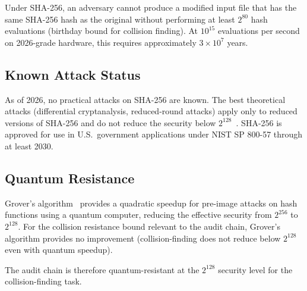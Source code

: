 \begin{theorem}
Under SHA-256, an adversary cannot produce a modified input file that
has the same SHA-256 hash as the original without performing at least
$2^{80}$ hash evaluations (birthday bound for collision finding).
At $10^{15}$ evaluations per second on 2026-grade hardware, this requires
approximately $3 \times 10^7$ years.
\end{theorem}

\subsection{Known Attack Status}

As of 2026, no practical attacks on SHA-256 are known.
The best theoretical attacks (differential cryptanalysis, reduced-round
attacks) apply only to reduced versions of SHA-256 and do not reduce
the security below $2^{128}$~\citep{mendel2013rebound}.
SHA-256 is approved for use in U.S.\ government applications under
NIST SP 800-57 through at least 2030.

\subsection{Quantum Resistance}

Grover's algorithm~\citep{grover1996fast} provides a quadratic speedup
for pre-image attacks on hash functions using a quantum computer,
reducing the effective security from $2^{256}$ to $2^{128}$.
For the collision resistance bound relevant to the audit chain, Grover's
algorithm provides no improvement (collision-finding does not reduce
below $2^{128}$ even with quantum speedup).

The \bisect{} audit chain is therefore quantum-resistant at the
$2^{128}$ security level for the collision-finding task.
